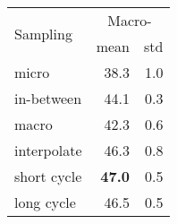 \begin{tabular}{l r r}
\toprule
	\multirow{2}{*}{Sampling} & \multicolumn{2}{c}{Macro-\fone{}} \\
	\cmidrule(lr){2-3}
	 & \multicolumn{1}{c}{mean} & \multicolumn{1}{c}{std} \\
\midrule
	micro & 38.3 & 1.0 \\
	in-between & 44.1 & 0.3 \\
	macro & 42.3 & 0.6 \\
	interpolate & 46.3 & 0.8 \\
    short cycle & \textbf{47.0} & 0.5 \\
	long cycle & 46.5 & 0.5 \\
\bottomrule
\end{tabular}
